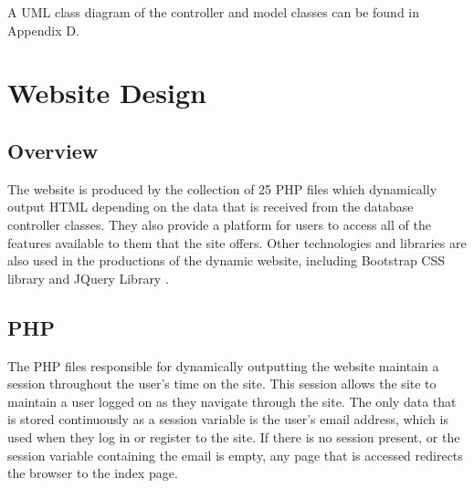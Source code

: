 		A UML class diagram of the controller and model classes can be found in Appendix D. 
		
\section{Website Design}
	\subsection{Overview}
		The website is produced by the collection of 25 PHP files which dynamically output HTML depending on the data that is received from the database controller classes. They also provide a platform for users to access all of the features available to them that the site offers. Other technologies and libraries are also used in the productions of the dynamic website, including Bootstrap CSS library \cite{bootstrap_css} and JQuery Library \cite{jquery_library}.
		
	\subsection{PHP}
		The PHP files responsible for dynamically outputting the website maintain a session throughout the user's time on the site. This session allows the site to maintain a user logged on as they navigate through the site. The only data that is stored continuously as a session variable is the user's email address, which is used when they log in or register to the site. If there is no session present, or the session variable containing the email is empty, any page that is accessed redirects the browser to the index page.
		
